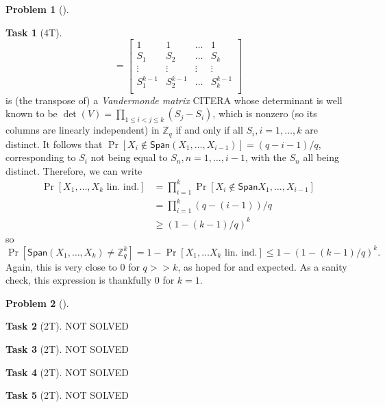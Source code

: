 \documentclass[11pt,twoside]{article}
\theoremstyle{definition}
\newtheorem{amsproblem}{Problem}
\newtheorem{amssubproblem}{Task}[amsproblem]
\newenvironment{problem}[1][]{%
  \begin{amsproblem}[#1]
  }{%
  \end{amsproblem}
}
\newenvironment{subproblem}[1][]{%
  \begin{amssubproblem}[#1]
  }{%
  \end{amssubproblem}
}
\newcommand{\TP}[1]{#1T}
\newcommand{\Span}{\mathsf{Span}}
\newcommand{\Z}{\mathbb{Z}}
\begin{document}
\begin{problem}
\begin{subproblem}[\TP{4}]
\[      =
      \begin{bmatrix}
        1 & 1 & \ldots & 1 \\
        S_1 & S_2 & \ldots & S_k \\
        \vdots & \vdots & \vdots & \vdots \\
        S_1^{k-1} & S_2^{k-1} & \ldots & S_k^{k-1} \\
      \end{bmatrix}
    \]
    is (the transpose of) a \emph{Vandermonde matrix} CITERA whose determinant is well known to be $\det(V) = \prod_{1 \leq i < j \leq k} (S_j - S_i)$, which is nonzero (so its columns are linearly independent) in $\Z_q$ if and only if all $S_i, i = 1, \ldots, k$ are distinct. It follows that $\Pr[X_i \not\in \Span(X_1, \ldots, X_{i-1})] = (q-i-1)/q$, corresponding to $S_i$ not being equal to $S_n, n = 1, \ldots, i-1$, with the $S_n$ all being distinct. Therefore, we can write
    \[
    \begin{aligned}
      \Pr[X_1, \ldots, X_k \text{ lin. ind.}]
      &= \prod_{i=1}^k\Pr[X_i \not\in \Span{X_1, \ldots, X_{i-1}}] \\
      &= \prod_{i=1}^k(q-(i-1))/q \\
      &\geq (1-(k-1)/q)^k
    \end{aligned}
    \]
    so
    \[
      \Pr[\Span(X_1, \ldots, X_k) \neq \Z_q^k] = 1 - \Pr[X_1, \ldots X_k \text{ lin. ind.}] \leq 1 - (1-(k-1)/q)^k.
    \]
    Again, this is very close to 0 for $q >> k$, as hoped for and expected. As a sanity check, this expression is thankfully 0 for $k=1$.
  \end{subproblem}
\end{problem}

\noindent
\hrulefill

\begin{problem}
  \begin{subproblem}[\TP{2}]
    NOT SOLVED %
  \end{subproblem}
  \begin{subproblem}[\TP{2}]
    NOT SOLVED %
  \end{subproblem}
  \begin{subproblem}[\TP{2}]
    NOT SOLVED %
  \end{subproblem}
  \begin{subproblem}[\TP{2}]
    NOT SOLVED %
  \end{subproblem}
\end{problem}



{}

\end{document}
